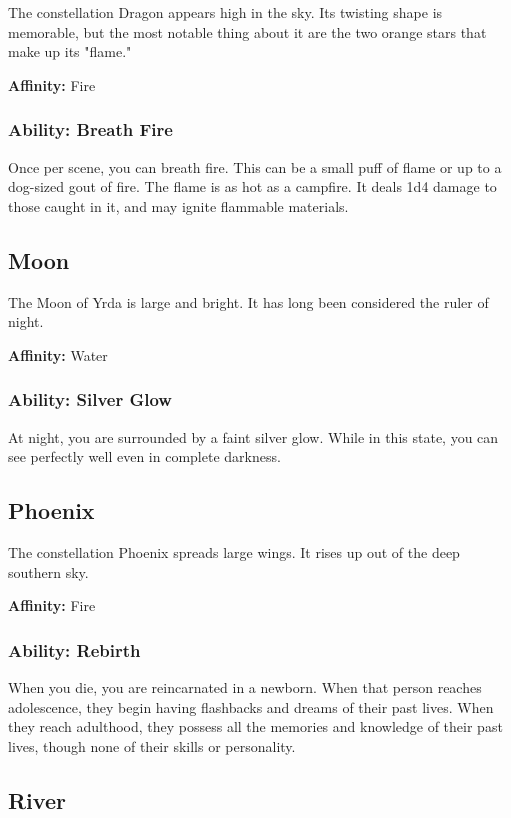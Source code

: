 \begin{multicols}{2}
The constellation Dragon appears high in the sky. Its twisting
shape is memorable, but the most notable thing about it are
the two orange stars that make up its "flame."

\textbf{Affinity:} Fire

\subsubsection{Ability: Breath Fire}

Once per scene, you can breath fire. This can be a small puff of flame
or up to a dog-sized gout of fire. The flame is as hot as a campfire. It
deals 1d4 damage to those caught in it, and may ignite flammable
materials.

\subsection{Moon}

The Moon of Yrda is large and bright. It has long been considered
the ruler of night.

\textbf{Affinity:} Water

\subsubsection{Ability: Silver Glow}

At night, you are surrounded by a faint silver glow. While in this state,
you can see perfectly well even in complete darkness.

\subsection{Phoenix}

The constellation Phoenix spreads large wings. It rises up out of the
deep southern sky.

\textbf{Affinity:} Fire

\subsubsection{Ability: Rebirth}

When you die, you are reincarnated in a newborn. When that person
reaches adolescence, they begin having flashbacks and dreams of their
past lives. When they reach adulthood, they possess all the memories
and knowledge of their past lives, though none of their skills or personality.

\subsection{River}


\end{multicols}
